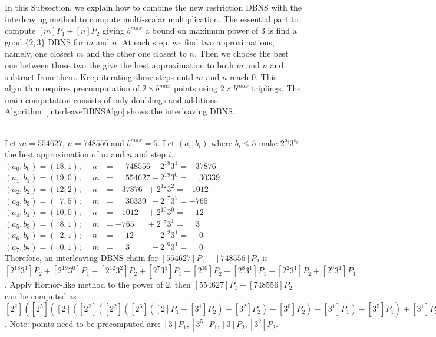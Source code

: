 In this Subsection, we explain how to combine the new restriction DBNS with the interleaving method to compute multi-scalar multiplication.
The essential part to compute $[m]P_1 + [n]P_2$ giving $b^{max}$ a bound on maximum power of 3 is find a good $\{2,3\}$ DBNS for $m$ and $n$.
At each step, we find two approximations, namely, one closest $m$ and the other one closest to $n$.
Then we choose the best one between those two the give the best approximation to both $m$ and $n$ and subtract from them.
Keep iterating these steps until $m$ and $n$ reach $0$.
This algorithm requires precomputation of $2 \times b^{max}$ points using $2 \times b^{max}$ triplings.
The main computation consists of only doublings and additions.
Algorithm~\ref{interleaveDBNSAlgo} shows the interleaving DBNS.

 \\
Let $m = 554627$, $n = 748556$ and $b^{max} = 5$.
Let $(a_i,b_i)$ where $b_i \le 5$ make $2^{a_i}3^{b_i}$ the best approximation of $m$ and $n$ and step $i$. \\
$(a_0,b_0) = (18,1)$;		$\quad n\phantom{m} = \phantom{-}748556			- 2^{18}3^{1}		= -37876$ \\
$(a_1,b_1) = (19,0)$;		$\quad m\phantom{n} = \phantom{-}554627			- 2^{19}3^{0}		= \phantom{-}30339$ \\
$(a_2,b_2) = (12,2)$;		$\quad n\phantom{m} = -37876\phantom{0}			+ 2^{12}3^{2}		= -1012$ \\
$(a_3,b_3) = (\phantom{0}7,5)$; $\quad m\phantom{n} = \phantom{-}30339\phantom{0}	- 2^{\phantom{0}7}3^{5} = -765$ \\
$(a_4,b_4) = (10,0)$;		$\quad n\phantom{m}=  -1012\phantom{00}			+ 2^{10}3^{0}		= \phantom{-}12$ \\
$(a_5,b_5) = (\phantom{0}8,1)$; $\quad m\phantom{n}=  -765\phantom{000}			+ 2^{\phantom{0}8}3^{1} = \phantom{-}3$ \\
$(a_6,b_6) = (\phantom{0}2,1)$; $\quad n\phantom{m}= \phantom{-}12\phantom{0000}	- 2^{\phantom{0}2}3^{1} = \phantom{-}0$ \\
$(a_7,b_7) = (\phantom{0}0,1)$; $\quad m\phantom{n}= \phantom{-}3\phantom{00000}	- 2^{\phantom{0}0}3^{1} = \phantom{-}0$ \\
Therefore, an interleaving DBNS chain for $[554627]P_1 + [748556]P_2$ is
$[2^{18}3^{1}]P_2 + [2^{19}3^{0}]P_1 - [2^{12}3^{2}]P_2 + [2^{7}3^{5}]P_1 - [2^{10}]P_2 - [2^{8}3^{1}]P_1 + [2^{2}3^{1}]P_2 + [2^{0}3^{1}]P_1$.
Apply Hornor-like method to the power of $2$, then $[554627]P_1 + [748556]P_2$ can be computed as
$[2^2]([2^5]([2]([2^2]([2^2]([2^6]([2]P_1 + [3^1]P_2) - [3^2]P_2) - [3^0]P_2) - [3^1]P_1) + [3^5]P_1) + [3^1]P_2) + [3^1]P_1$.
Note: points need to be precomputed are: $[3]P_1, [3^5]P_1, [3]P_2, [3^2]P_2$. \\


